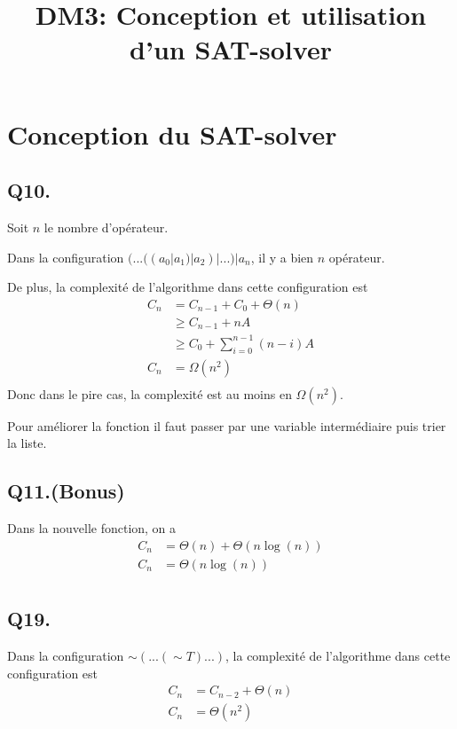

\title{DM3: Conception et utilisation d’un SAT-solver}
\author{}
\date{}


    \maketitle
    \section{Conception du SAT-solver}
    \subsection*{Q10.}
    Soit $n$ le nombre d'opérateur.
    
    Dans la configuration $(...((a_0 | a_1) | a_2) | ...) | a_n$,
    il y a bien $n$ opérateur.
    
    De plus, la complexité de l'algorithme dans cette configuration est
    \begin{align*}
        C_n &= C_{n-1} + C_0 + \Theta(n)\\
        &\geq C_{n-1} + nA\\
        &\geq C_0 + \sum_{i=0}^{n-1}(n-i)A\\
        C_n &= \boxed{\Omega(n^2)}\\
    \end{align*}
    Donc dans le pire cas, la complexité est au moins en $\Omega(n^2)$.
    
    Pour améliorer la fonction
    il faut passer par une variable intermédiaire puis trier la liste.
    
    \subsection*{Q11.(Bonus)}
    Dans la nouvelle fonction, on a
    \begin{align*}
        C_n &= \Theta(n) + \Theta(n\log(n))\\
        C_n &= \boxed{\Theta(n\log(n))}\\
    \end{align*}
    
    \subsection*{Q19.}
    Dans la configuration $\sim(...(\sim T)...)$, 
    la complexité de l'algorithme dans cette configuration est
    \begin{align*}
        C_n &= C_{n-2} + \Theta(n)\\
        C_n &= \boxed{\Theta(n^2)}\\
    \end{align*}
    
